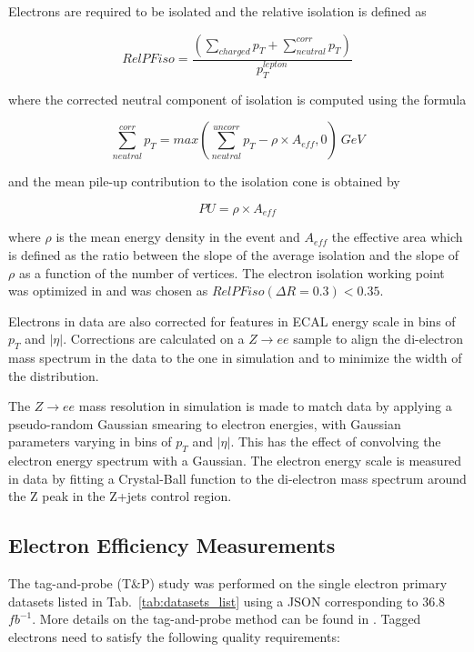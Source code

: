 Electrons are required to be isolated and the relative isolation is defined as

\begin{equation}
RelPFiso = \frac{\left( \sum_{charged} p_{T} + \sum_{neutral}^{corr} p_{T} \right)}{p_{T}^{lepton}}
\end{equation}

where the corrected neutral component of isolation is computed using the formula

\begin{equation}
\sum_{neutral}^{corr} p_{T} = max( \sum_{neutral}^{uncorr} p_{T} - \rho \times A_{eff}, 0 )~GeV
\end{equation}

and the mean pile-up contribution to the isolation cone is obtained by

\begin{equation}
PU = \rho \times A_{eff}
\end{equation}

where $\rho$ is the mean energy density in the event and $A_{eff}$ the effective area which is defined as the ratio between the slope of the average isolation and the slope of $\rho$ as a function of the number of vertices. The electron isolation working point was optimized in \cite{bib:CMS-AN-15-277} and was chosen as $RelPFiso(\Delta R = 0.3) < 0.35$.

Electrons in data are also corrected for features in ECAL energy scale in bins of $p_{T}$ and $|\eta|$. Corrections are calculated on a $Z \rightarrow ee$ sample to align the di-electron mass spectrum in the data to the one in simulation and to minimize the width of the distribution.

The $Z \rightarrow ee$ mass resolution in simulation is made to match data by applying a pseudo-random Gaussian smearing to electron energies, with Gaussian parameters varying in bins of $p_{T}$ and $|\eta|$. This has the effect of convolving the electron energy spectrum with a Gaussian. The electron energy scale is measured in data by fitting a Crystal-Ball function to the di-electron mass spectrum around the Z peak in the Z+jets control region.

\subsection{Electron Efficiency Measurements}
The tag-and-probe (T$\&$P) study was performed on the single electron primary datasets listed in Tab.~\ref{tab:datasets_list} using a JSON corresponding to 36.8$fb^{-1}$. More details on the tag-and-probe method can be found in \cite{bib:CMS-AN-15-277}. Tagged electrons need to satisfy the following quality requirements:

